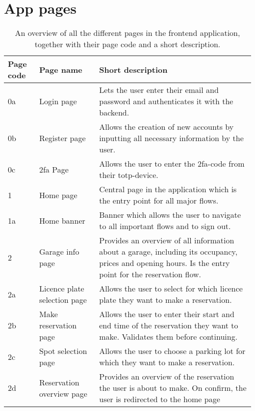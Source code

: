 \section{App pages}\label{app:app-pages}
\begin{table}
\centering
         \caption[An overview of all the different pages in the frontend application.]{An overview of all the different pages in the frontend application, together with their page code and a short description.}
        \label{tab:app-pages}

\begin{tabular}{|p{2cm}|p{4cm}|p{9cm}|}

         \hline
         \textbf{Page code}& \textbf{Page name} & \textbf{Short description} \\
         \hline
         \hline
         0a & Login page & Lets the user enter their email and password and authenticates it with the backend.\\
         \hline         
         0b & Register page & Allows the creation of new accounts by inputting all necessary information by the user.\\
         \hline 
         0c & \ac{2fa} Page & Allows the user to enter the \ac{2fa}-code from their \ac{totp}-device. \\
         \hline 
         \hline
         1 & Home page & Central page in the application which is the entry point for all major flows.\\
         \hline 
         1a & Home banner & Banner which allows the user to navigate to all important flows and to sign out. \\
         \hline 
         \hline
         2 & Garage info page & Provides an overview of all information about a garage, including its occupancy, prices and opening hours. Is the entry point for the reservation flow.\\
         \hline 
         2a & Licence plate selection page & Allows the user to select for which licence plate they want to make a reservation. \\
         \hline 
         2b & Make reservation page & Allows the user to enter their start and end time of the reservation they want to make. Validates them before continuing. \\
         \hline 
         2c & Spot selection page & Allows the user to choose a parking lot for which they want to make a reservation. \\
         \hline 
         2d & Reservation overview page &  Provides an overview of the reservation the user is about to make. On confirm, the user is redirected to the home page \\

\end{tabular}
\end{table}

